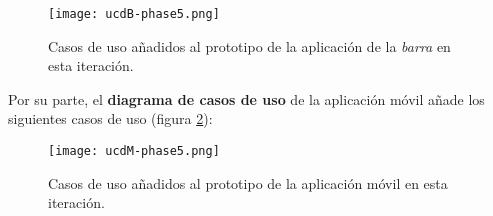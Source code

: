   \begin{figure}[!h]
    \begin{center}
      \texttt{[image: ucdB-phase5.png]}
      \caption{Casos de uso añadidos al prototipo de la aplicación
      de la \emph{barra} en esta iteración.}
      \label{fig:ucdB-phase5}
    \end{center}
  \end{figure}

Por su parte, el \textbf{diagrama de casos de uso} de la aplicación móvil
añade los siguientes casos de uso (figura \ref{fig:ucdM-phase5}):

  \begin{figure}[!h]
    \begin{center}
      \texttt{[image: ucdM-phase5.png]}
      \caption{Casos de uso añadidos al prototipo de la aplicación
      móvil en esta iteración.}
      \label{fig:ucdM-phase5}
    \end{center}
  \end{figure}

